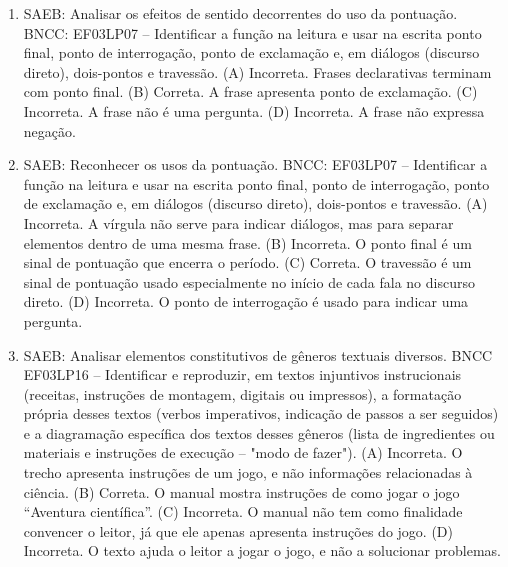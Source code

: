 \begin{enumerate}
\item
SAEB: Analisar os efeitos de sentido decorrentes do uso da pontuação.
BNCC: EF03LP07 -- Identificar a função na leitura e usar na escrita ponto
final, ponto de interrogação, ponto de exclamação e, em diálogos
(discurso direto), dois-pontos e travessão.
(A) Incorreta. Frases declarativas terminam com ponto final.
(B) Correta. A frase apresenta ponto de exclamação.
(C) Incorreta. A frase não é uma pergunta.
(D) Incorreta. A frase não expressa negação.

\item
SAEB: Reconhecer os usos da pontuação.
BNCC: EF03LP07 -- Identificar a função na leitura e usar na escrita ponto
final, ponto de interrogação, ponto de exclamação e, em diálogos
(discurso direto), dois-pontos e travessão.
(A) Incorreta. A vírgula não serve para indicar diálogos, mas para
separar elementos dentro de uma mesma frase.
(B) Incorreta. O ponto final é um sinal de pontuação que encerra o
período.
(C) Correta. O travessão é um sinal de pontuação usado especialmente no
início de cada fala no discurso direto.
(D) Incorreta. O ponto de interrogação é usado para indicar uma
pergunta.

\item
SAEB: Analisar elementos constitutivos de gêneros textuais diversos.
BNCC EF03LP16 -- Identificar e reproduzir, em textos injuntivos
instrucionais (receitas, instruções de montagem, digitais ou impressos),
a formatação própria desses textos (verbos imperativos, indicação de
passos a ser seguidos) e a diagramação específica dos textos desses
gêneros (lista de ingredientes ou materiais e instruções de execução --
"modo de fazer").
(A) Incorreta. O trecho apresenta instruções de um jogo, e não
informações relacionadas à ciência.
(B) Correta. O manual mostra instruções de como jogar o jogo ``Aventura
científica''.
(C) Incorreta. O manual não tem como finalidade convencer o leitor, já
que ele apenas apresenta instruções do jogo.
(D) Incorreta. O texto ajuda o leitor a jogar o jogo, e não a solucionar
problemas.
\end{enumerate}


